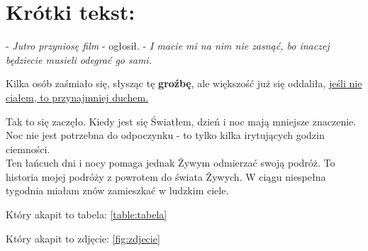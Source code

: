 \documentclass[12pkt,a4paper]{article}
\begin{document}
\section{Krótki tekst:}
- \emph{Jutro przyniosę film} - ogłosił. - \emph{I macie mi na nim nie zasnąć, bo inaczej będziecie musieli odegrać go sami.}

Kilka osób zaśmiało się, słysząc tę \textbf{groźbę}, ale większość już się oddaliła, \underline{jeśli nie ciałem, to przynajmniej duchem.}

Tak to się zaczęło. Kiedy jest się Światłem, dzień i noc mają mniejsze znaczenie. Noc nie jest potrzebna do odpoczynku - to tylko kilka irytujących godzin ciemności.\\ Ten łańcuch dni i nocy pomaga jednak Żywym odmierzać swoją podróż. To historia mojej podróży z powrotem do świata Żywych. W ciągu niespełna tygodnia miałam znów zamieszkać w ludzkim ciele.

Który akapit to tabela:
\ref{table:tabela}

Który akapit to zdjęcie:
\ref{fig:zdjecie}
\end{document}
